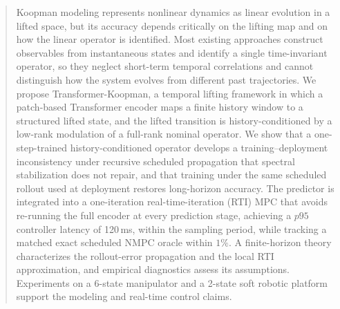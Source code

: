\begin{abstract}
Koopman modeling represents nonlinear dynamics as linear evolution in a lifted space, but its accuracy depends critically on the lifting map and on how the linear operator is identified. Most existing approaches construct observables from instantaneous states and identify a single time-invariant operator, so they neglect short-term temporal correlations and cannot distinguish how the system evolves from different past trajectories. We propose Transformer-Koopman, a temporal lifting framework in which a patch-based Transformer encoder maps a finite history window to a structured lifted state, and the lifted transition is history-conditioned by a low-rank modulation of a full-rank nominal operator. We show that a one-step-trained history-conditioned operator develops a training--deployment inconsistency under recursive scheduled propagation that spectral stabilization does not repair, and that training under the same scheduled rollout used at deployment restores long-horizon accuracy. The predictor is integrated into a one-iteration real-time-iteration (RTI) MPC that avoids re-running the full encoder at every prediction stage, achieving a $p95$ controller latency of 120\,ms, within the sampling period, while tracking a matched exact scheduled NMPC oracle within $1\%$. A finite-horizon theory characterizes the rollout-error propagation and the local RTI approximation, and empirical diagnostics assess its assumptions. Experiments on a 6-state manipulator and a 2-state soft robotic platform support the modeling and real-time control claims.
\end{abstract}
